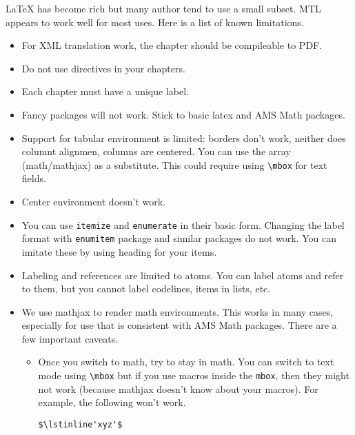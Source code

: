 LaTeX has become rich but many author tend to use a small subset.  MTL appears to work well for most uses. Here is a list of known limitations.
\begin{itemize}

\item For XML translation work, the chapter should be compileable to PDF.

\item Do not use \lstinline`` directives in your chapters.

\item Each chapter must have a unique label.

\item Fancy packages will not work.  Stick to basic latex and AMS Math packages.

\item Support for tabular environment is limited: borders don't work, neither does columnt alignmen, columns are centered.  You can use the array (math/mathjax) as a substitute.  This could require using \lstinline`\mbox` for text fields.  
 
\item Center environment doesn't work.

\item You can use \lstinline`itemize` and \lstinline`enumerate` in their basic form.  Changing the label format with \lstinline`enumitem` package and similar packages do not work.  You can imitate these by using heading for your items.  

\item Labeling and references are limited to atoms.  You can label atoms and refer to them, but you cannot label codelines, items in lists, etc.

\item We use mathjax to render math environments.  This works in many cases, especially for use that is consistent with AMS Math packages.  There are a few important caveats. 

\begin{itemize}
\item Once you switch to math, try to stay in math.  You can switch to text mode using \lstinline`\mbox` but if you use macros inside  the \lstinline`mbox`, then they might not work (because mathjax doesn't know about your macros).  For example, the following won't work. 
\begin{lstlisting}
$\lstinline'xyz'$
\end{lstlisting}


\end{itemize}
\end{itemize}
